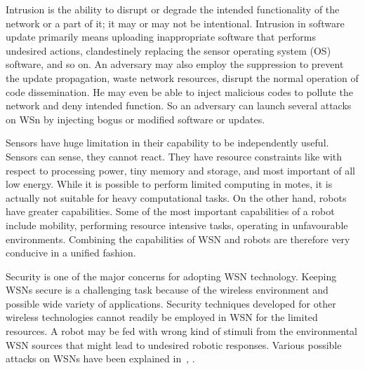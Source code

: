 \documentclass[conference,final]{IEEEtran}
\begin{document}
Intrusion is the ability to disrupt or degrade the intended functionality of the network or a part of it; it  may or may not be intentional.
Intrusion in software update primarily means uploading inappropriate software that performs undesired actions, clandestinely replacing the  sensor operating system (OS) software, and so on.
An adversary may also employ  the suppression to prevent the update propagation, waste network resources, disrupt the normal operation of code dissemination. 
He may even be able to inject malicious codes to pollute the network and deny intended function.
So an adversary can launch several attacks on WSn by  injecting bogus or modified software or updates. 


Sensors have huge limitation in their capability to be independently useful.
Sensors can sense, they cannot react. 
They have resource constraints like with respect to processing power, tiny memory and storage, and most important of all low energy.
While it is possible to perform limited computing in motes, it is actually not suitable for heavy computational tasks.
On the other hand, robots have greater capabilities.
Some of the most important capabilities of a robot include mobility, performing resource intensive tasks, operating in unfavourable environments.
Combining the capabilities of WSN and robots are therefore very conducive in a unified fashion.

Security is one of the major concerns for adopting WSN technology. 
Keeping WSNs secure is a challenging task because of the wireless environment and possible  wide variety of applications.
Security techniques developed for other wireless technologies cannot readily be employed in WSN for the limited resources.
A robot may be fed with wrong kind of stimuli from the environmental WSN sources that might  lead to undesired robotic responses. 
Various possible attacks on WSNs have been explained in~\cite{roosta2006taxonomy}, \cite{roosta2008attacks}.
\end{document}
